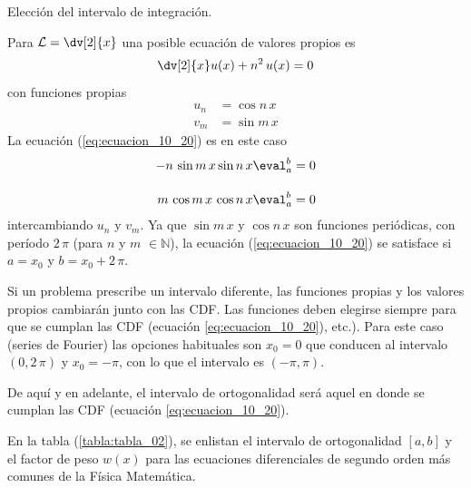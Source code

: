 \begin{ejemplo}{Elección del intervalo de integración.}

Para $\displaystyle \mathcal{L} = \dv[2]{x}$ una posible ecuación de valores propios es
\begin{equation}
\dv[2]{x} u(x) + n^{2} \, u(x) = 0
\label{eq:ecuacion_10_21}
\end{equation}
con funciones propias
\begin{align*}
u_{n} &= \cos n \, x \\
v_{m} &= \sin m \, x
\end{align*}
La ecuación (\ref{eq:ecuacion_10_20}) es en este caso
\begin{align*}
- n \, \sin m \, x \sin n \, x \eval^{b}_{a} &= 0 \\[1em]
m \, \cos m \, x \, \cos n \, x \eval^{b}_{a} &= 0 
\end{align*}
intercambiando $u_{n}$ y $v_{m}$. Ya que $\sin m \, x$ y $\cos n \, x$ son funciones periódicas, con período $2 \, \pi$ (para $n$ y $m$ $\in \mathbb{N}$), la ecuación (\ref{eq:ecuacion_10_20}) se satisface si $a = x_{0}$ y $b = x_{0} + 2 \, \pi$.
\par
Si un problema prescribe un intervalo diferente, las funciones propias y los valores propios cambiarán junto con las CDF. Las funciones deben elegirse siempre para que se cumplan las CDF (ecuación \ref{eq:ecuacion_10_20}), etc.). Para este caso (series de Fourier) las opciones habituales son $x_{0} = 0$ que conducen al intervalo $(0, 2 \, \pi)$ y $x_{0} = - \pi$, con lo que el intervalo es $(-\pi, \pi)$.
\end{ejemplo}
De aquí y en adelante, el intervalo de ortogonalidad será aquel en donde se cumplan las CDF (ecuación \ref{eq:ecuacion_10_20}).
\par
En la tabla (\ref{tabla:tabla_02}), se enlistan el intervalo de ortogonalidad $[a, b]$ y el factor de peso $w (x)$ para las ecuaciones diferenciales de segundo orden más comunes de la Física Matemática.
